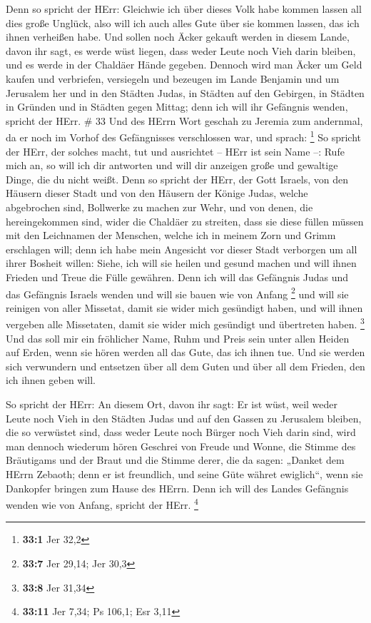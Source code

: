  Denn so spricht der HErr: Gleichwie ich über dieses Volk
habe kommen lassen all dies große Unglück, also will ich auch alles Gute
über sie kommen lassen, das ich ihnen verheißen habe.  Und
sollen noch Äcker gekauft werden in diesem Lande, davon ihr sagt, es
werde wüst liegen, dass weder Leute noch Vieh darin bleiben, und es
werde in der Chaldäer Hände gegeben.  Dennoch wird man
Äcker um Geld kaufen und verbriefen, versiegeln und bezeugen im Lande
Benjamin und um Jerusalem her und in den Städten Judas, in Städten auf
den Gebirgen, in Städten in Gründen und in Städten gegen Mittag; denn
ich will ihr Gefängnis wenden, spricht der HErr. \# 33  Und
des HErrn Wort geschah zu Jeremia zum andernmal, da er noch im Vorhof
des Gefängnisses verschlossen war, und sprach: \footnote{\textbf{33:1}
  Jer 32,2}  So spricht der HErr, der solches macht, tut und
ausrichtet -- HErr ist sein Name --:  Rufe mich an, so will
ich dir antworten und will dir anzeigen große und gewaltige Dinge, die
du nicht weißt.  Denn so spricht der HErr, der Gott Israels,
von den Häusern dieser Stadt und von den Häusern der Könige Judas,
welche abgebrochen sind, Bollwerke zu machen zur Wehr,  und
von denen, die hereingekommen sind, wider die Chaldäer zu streiten, dass
sie diese füllen müssen mit den Leichnamen der Menschen, welche ich in
meinem Zorn und Grimm erschlagen will; denn ich habe mein Angesicht vor
dieser Stadt verborgen um all ihrer Bosheit willen:  Siehe,
ich will sie heilen und gesund machen und will ihnen Frieden und Treue
die Fülle gewähren.  Denn ich will das Gefängnis Judas und
das Gefängnis Israels wenden und will sie bauen wie von Anfang
\footnote{\textbf{33:7} Jer 29,14; Jer 30,3}  und will sie
reinigen von aller Missetat, damit sie wider mich gesündigt haben, und
will ihnen vergeben alle Missetaten, damit sie wider mich gesündigt und
übertreten haben. \footnote{\textbf{33:8} Jer 31,34}  Und
das soll mir ein fröhlicher Name, Ruhm und Preis sein unter allen Heiden
auf Erden, wenn sie hören werden all das Gute, das ich ihnen tue. Und
sie werden sich verwundern und entsetzen über all dem Guten und über all
dem Frieden, den ich ihnen geben will.

 So spricht der HErr: An diesem Ort, davon ihr sagt: Er ist
wüst, weil weder Leute noch Vieh in den Städten Judas und auf den Gassen
zu Jerusalem bleiben, die so verwüstet sind, dass weder Leute noch
Bürger noch Vieh darin sind,  wird man dennoch wiederum
hören Geschrei von Freude und Wonne, die Stimme des Bräutigams und der
Braut und die Stimme derer, die da sagen: „Danket dem HErrn Zebaoth;
denn er ist freundlich, und seine Güte währet ewiglich``, wenn sie
Dankopfer bringen zum Hause des HErrn. Denn ich will des Landes
Gefängnis wenden wie von Anfang, spricht der HErr. \footnote{\textbf{33:11}
  Jer 7,34; Ps 106,1; Esr 3,11}

